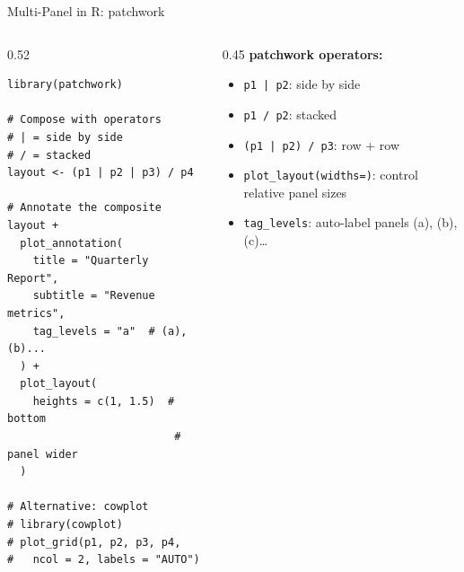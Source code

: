 \documentclass[10pt]{beamer}
\begin{document}
\begin{frame}[fragile]{Multi-Panel in R: patchwork}
  \begin{columns}[T]
    \begin{column}{0.52\textwidth}
\begin{lstlisting}[style=rstyle]
library(patchwork)

# Compose with operators
# | = side by side
# / = stacked
layout <- (p1 | p2 | p3) / p4

# Annotate the composite
layout +
  plot_annotation(
    title = "Quarterly Report",
    subtitle = "Revenue metrics",
    tag_levels = "a"  # (a),(b)...
  ) +
  plot_layout(
    heights = c(1, 1.5)  # bottom
                          # panel wider
  )

# Alternative: cowplot
# library(cowplot)
# plot_grid(p1, p2, p3, p4,
#   ncol = 2, labels = "AUTO")
\end{lstlisting}
    \end{column}
    \begin{column}{0.45\textwidth}
      \textbf{patchwork operators:}

      \begin{itemize}
        \item \texttt{p1 | p2}: side by side
        \item \texttt{p1 / p2}: stacked
        \item \texttt{(p1 | p2) / p3}: row + row
        \item \texttt{plot\_layout(widths=)}: control
              relative panel sizes
        \item \texttt{tag\_levels}: auto-label
              panels (a), (b), (c)\ldots
      \end{itemize}
    \end{column}
  \end{columns}
\end{frame}
\end{document}
